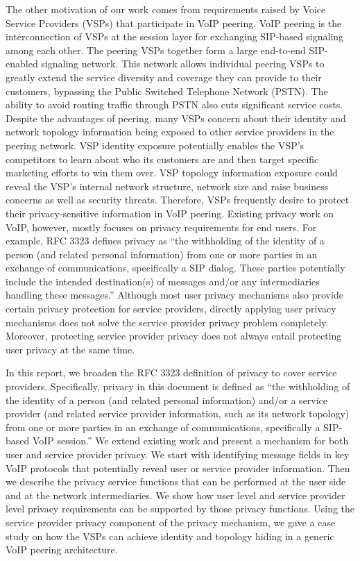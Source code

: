 \documentclass[letterpaper,notitlepage,times,12pt]{article}
\begin{document}
The other motivation of our work comes from requirements raised by Voice Service Providers (VSPs) that participate in VoIP peering. VoIP peering is the interconnection of VSPs at the session layer for exchanging SIP-based signaling among each other. The peering VSPs together form a large end-to-end SIP-enabled signaling network. This network allows individual peering VSPs to greatly extend the service diversity and coverage they can provide to their customers, bypassing the Public Switched Telephone Network (PSTN). The ability to avoid routing traffic through PSTN also cuts significant service costs. Despite the advantages of peering, many VSPs concern about their identity and network topology information being exposed to other service providers in the peering network. VSP identity exposure potentially enables the VSP's competitors to learn about who its customers are and then target specific marketing efforts to win them over. VSP topology information exposure could reveal the VSP's internal network structure, network size and raise business concerns as well as security threats. Therefore, VSPs frequently desire to protect their privacy-sensitive information in VoIP peering. Existing privacy work on VoIP, however, mostly focuses on privacy requirements for end users. For example, RFC 3323 defines privacy as ``the withholding of the identity of a person (and related personal information) from one or more parties in an exchange of communications, specifically a SIP dialog. These parties potentially include the intended destination(s) of messages and/or any intermediaries handling these messages.'' Although most user privacy mechanisms also provide certain privacy protection for service providers, directly applying user privacy mechanisms does not solve the service provider privacy problem completely. Moreover, protecting service provider privacy does not always entail protecting user privacy at the same time.

In this report, we broaden the RFC 3323 definition of privacy to cover service providers. Specifically, privacy in this document is defined as ``the withholding of the identity of a person (and related personal information) and/or a service provider (and related service provider information, such as its network topology) from one or more parties in an exchange of communications, specifically a SIP-based VoIP session.'' We extend existing work and present a mechanism for both user and service provider privacy. We start with identifying message fields in key VoIP protocols that potentially reveal user or service provider information. Then we describe the privacy service functions that can be performed at the user side and at the network intermediaries. We show how user level and service provider level privacy requirements can be supported by those privacy functions. Using the service provider privacy component of the privacy mechanism, we gave a case study on how the VSPs can achieve identity and topology hiding in a generic VoIP peering architecture.
\end{document}
